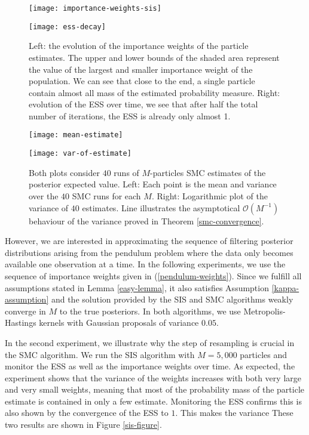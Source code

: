 \begin{figure}[htbp]
  \begin{minipage}{.5\textwidth}
    \texttt{[image: importance-weights-sis]}
  \end{minipage}
  \begin{minipage}{.5\textwidth}
    \texttt{[image: ess-decay]}
  \end{minipage}
  \caption{Left: the evolution of the importance weights of the particle estimates. The upper and lower bounds of the shaded area represent the value of the largest and smaller importance weight of the population. We can see that close to the end, a single particle contain almost all mass of the estimated probability measure. Right: evolution of the ESS over time, we see that after half the total number of iterations, the ESS is already only almost 1.}\label{sis-figure}

  \bigskip
  
  \begin{minipage}{.5\textwidth}
    \texttt{[image: mean-estimate]}
  \end{minipage}
  \begin{minipage}{.5\textwidth}
    \texttt{[image: var-of-estimate]}
  \end{minipage}
  \caption{Both plots consider $40$ runs of $M$-particles SMC estimates of the posterior expected value. Left: Each point is the mean and variance over the $40$ SMC runs for each $M$. Right: Logarithmic plot of the variance of $40$ estimates. Line illustrates the asymptotical $\mathcal{O}(M^{-1})$ behaviour of the variance proved in Theorem \ref{smc-convergence}. }\label{smc-figure}
\end{figure}


However, we are interested in approximating the sequence of filtering posterior distributions arising from the pendulum problem where the data only becomes available one observation at a time. In the following experiments, we use the sequence of importance weights given in (\ref{pendulum-weights}). Since we fulfill all assumptions stated in Lemma \ref{easy-lemma}, it also satisfies Assumption \ref{kappa-assumption} and the solution provided by the SIS and SMC algorithms weakly converge in $M$ to the true posteriors. In both algorithms, we use Metropolis-Hastings kernels with Gaussian proposals of variance $0.05$. 

In the second experiment, we illustrate why the step of resampling is crucial in the SMC algorithm. We run the SIS algorithm with $M=5,000$ particles and monitor the ESS as well as the importance weights over time. As expected, the experiment shows that the variance of the weights increases with both very large and very small weights, meaning that most of the probability mass of the particle estimate is contained in only a few estimate. Monitoring the ESS confirms this is also shown by the convergence of the ESS to $1$. This makes the variance These two results are shown in Figure \ref{sis-figure}.

